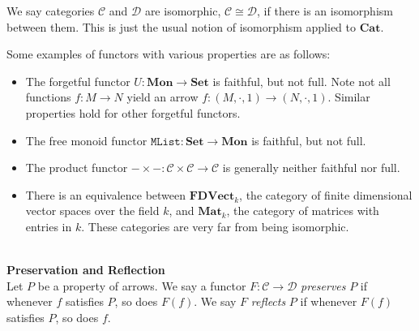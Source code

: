 \documentclass[]{amsbook}
\newcommand{\catname}[1]{\mathbf{#1}}
\newcommand{\0}{\mathbf{0}}
\newcommand{\1}{\mathbf{1}}
\newcommand{\mc}[1]{\mathcal{#1}}
\begin{document}
We say categories $\mc{C}$ and $\mc{D}$ are isomorphic, $\mc{C} \cong
\mc{D}$, if there is an isomorphism between them. This is just the usual notion
of isomorphism applied to $\catname{Cat}$.

Some examples of functors with various properties are as follows:
\begin{itemize}
    \item The forgetful functor $U: \catname{Mon} \to \catname{Set}$ is
    faithful, but not full. Note not all functions $f: M \to N$ yield an arrow
    $f: (M, \cdot, 1) \to (N, \cdot, 1)$. Similar properties hold for other
    forgetful functors.

    \item The free monoid functor $\texttt{MList}: \catname{Set} \to
    \catname{Mon}$ is faithful, but not full.

    \item The product functor $- \times - : \mc{C} \times \mc{C} \to \mc{C}$
    is generally neither faithful nor full.

    \item There is an equivalence between $\catname{FDVect}_k$, the category
    of finite dimensional vector spaces over the field $k$, and
    $\catname{Mat}_k$, the category of matrices with entries in $k$. These
    categories are very far from being isomorphic.
\end{itemize}
~\\
\textbf{Preservation and Reflection}\\
Let $P$ be a property of arrows. We say a functor $F: \mc{C} \to \mc{D}$
\emph{preserves} $P$ if whenever $f$ satisfies $P$, so does $F(f)$. We say $F$
\emph{reflects} $P$ if whenever $F(f)$ satisfies $P$, so does $f$.
\end{document}
